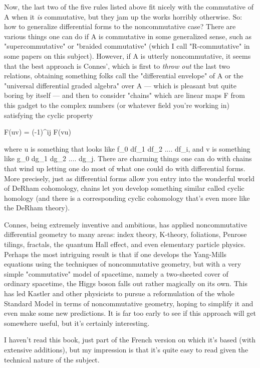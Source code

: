 Now, the last two of the five rules listed above fit nicely with the
commutative of A when it \emph{is} commutative, but they jam up the works
horribly otherwise.  So: how to generalize differential forms to the
noncommutative case?  There are various things one can do if A is
commutative in some generalized sense, such as "supercommutative" or
"braided commutative" (which I call "R-commutative" in some papers on this
subject).  However, if A is utterly noncommutative, it seems that the
best approach is Connes', which is first to \emph{throw out} the last two
relations, obtaining something folks call the "differential envelope" of
A or the "universal differential graded algebra" over A --- which is
pleasant but quite boring by itself --- and then to consider "chains"
which are linear maps F from this gadget to the complex numbers (or
whatever field you're working in) satisfying the cyclic property

F(uv) = (-1)^{ij} F(vu)

where u is something that looks like f_0 df_1 df_2 .... df_i, and
v is something like g_0 dg_1 dg_2 .... dg_j.  There are charming things
one can do with chains that wind up letting one do most of what one
could do with differential forms.  More precisely, just as differential
forms allow you entry into the wonderful world of DeRham cohomology, 
chains let you develop something similar called cyclic homology (and
there is a corresponding cyclic cohomology that's even more like the
DeRham theory).   

Connes, being extremely inventive and ambitious, has applied
noncommutative differential geometry to many areas: index theory,
K-theory, foliations, Penrose tilings, fractals, the quantum Hall
effect, and even elementary particle physics.  Perhaps the most
intriguing result is that if one develops the Yang-Mills equations 
using the techniques of noncommutative geometry, but with a very simple
"commutative" model of spacetime, namely a two-sheeted cover of ordinary
spacetime, the Higgs boson falls out rather magically on its own.  This
has led Kastler and other physicists to pursue a reformulation of the
whole Standard Model in terms of noncommutative geometry, hoping to
simplify it and even make some new predictions.  It is far too early to
see if this approach will get somewhere useful, but it's certainly
interesting.  

I haven't read this book, just part of the French version on which it's
based (with extensive additions), but my impression is that it's quite
easy to read given the technical nature of the subject.


